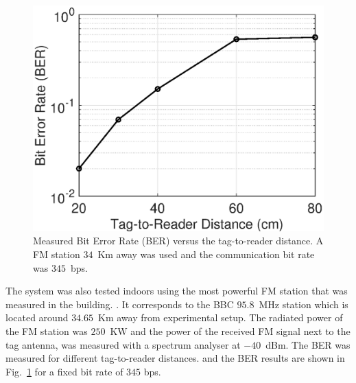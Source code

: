 \documentclass[journal]{IEEEtran}
\begin{document}
\begin{figure}[t]
\centering
\includegraphics[width=0.8\columnwidth]{Figures/Fig14.eps}
\caption{Measured Bit Error Rate (BER) versus the tag-to-reader distance. A  FM station $34$~Km away was used and  the communication bit rate was  $345$~bps.}
\label{fig:BER_ind}
\end{figure}
%
The  system was also tested indoors using the most  powerful FM station that was measured in the building. \cite{daskalakis2017ambient}. 
%
It corresponds to the  BBC $95.8$~MHz station which is located around $34.65$~Km away from experimental setup.
%
 The  radiated power of the FM station was $250$~KW 
and the power of the received FM signal next to the tag 
antenna, was measured with a spectrum analyser at $-40$~dBm.
%
The BER was measured for different tag-to-reader distances.
and the BER results are shown in Fig.~\ref{fig:BER_ind} for a fixed bit rate of  $345$ bps.
\end{document}
